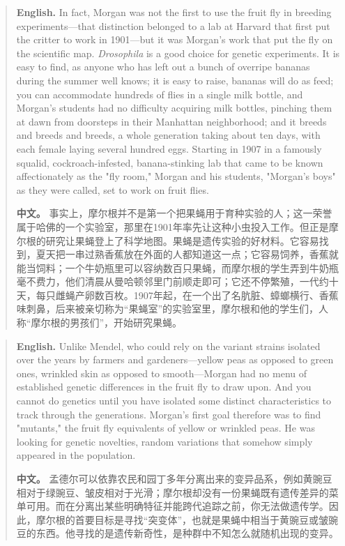 \begin{quote}
\noindent\textbf{English.} In fact, Morgan was not the first to use the fruit fly in breeding experiments---that distinction belonged to a lab at Harvard that first put the critter to work in 1901---but it was Morgan's work that put the fly on the scientific map. \emph{Drosophila} is a good choice for genetic experiments. It is easy to find, as anyone who has left out a bunch of overripe bananas during the summer well knows; it is easy to raise, bananas will do as feed; you can accommodate hundreds of flies in a single milk bottle, and Morgan's students had no difficulty acquiring milk bottles, pinching them at dawn from doorsteps in their Manhattan neighborhood; and it breeds and breeds and breeds, a whole generation taking about ten days, with each female laying several hundred eggs. Starting in 1907 in a famously squalid, cockroach-infested, banana-stinking lab that came to be known affectionately as the "fly room," Morgan and his students, "Morgan's boys" as they were called, set to work on fruit flies.

\smallskip
\noindent\textbf{中文。} 事实上，摩尔根并不是第一个把果蝇用于育种实验的人；这一荣誉属于哈佛的一个实验室，那里在1901年率先让这种小虫投入工作。但正是摩尔根的研究让果蝇登上了科学地图。果蝇是遗传实验的好材料。它容易找到，夏天把一串过熟香蕉放在外面的人都知道这一点；它容易饲养，香蕉就能当饲料；一个牛奶瓶里可以容纳数百只果蝇，而摩尔根的学生弄到牛奶瓶毫不费力，他们清晨从曼哈顿邻里门前顺走即可；它还不停繁殖，一代约十天，每只雌蝇产卵数百枚。1907年起，在一个出了名肮脏、蟑螂横行、香蕉味刺鼻，后来被亲切称为“果蝇室”的实验室里，摩尔根和他的学生们，人称“摩尔根的男孩们”，开始研究果蝇。
\end{quote}

\begin{quote}
\noindent\textbf{English.} Unlike Mendel, who could rely on the variant strains isolated over the years by farmers and gardeners---yellow peas as opposed to green ones, wrinkled skin as opposed to smooth---Morgan had no menu of established genetic differences in the fruit fly to draw upon. And you cannot do genetics until you have isolated some distinct characteristics to track through the generations. Morgan's first goal therefore was to find "mutants," the fruit fly equivalents of yellow or wrinkled peas. He was looking for genetic novelties, random variations that somehow simply appeared in the population.

\smallskip
\noindent\textbf{中文。} 孟德尔可以依靠农民和园丁多年分离出来的变异品系，例如黄豌豆相对于绿豌豆、皱皮相对于光滑；摩尔根却没有一份果蝇既有遗传差异的菜单可用。而在分离出某些明确特征并能跨代追踪之前，你无法做遗传学。因此，摩尔根的首要目标是寻找“突变体”，也就是果蝇中相当于黄豌豆或皱豌豆的东西。他寻找的是遗传新奇性，是种群中不知怎么就随机出现的变异。
\end{quote}

